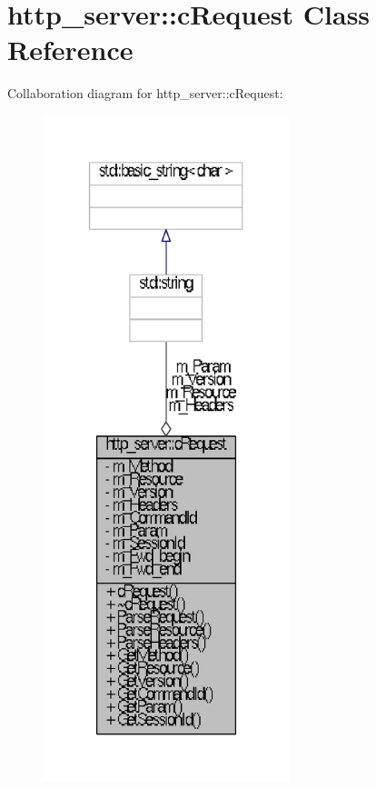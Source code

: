 \hypertarget{classhttp__server_1_1cRequest}{\section{http\-\_\-server\-:\-:c\-Request \-Class \-Reference}
\label{classhttp__server_1_1cRequest}
}


\-Collaboration diagram for http\-\_\-server\-:\-:c\-Request\-:
\nopagebreak
\begin{figure}[H]
\begin{center}
\leavevmode
\includegraphics[height=550pt]{classhttp__server_1_1cRequest__coll__graph}
\end{center}
\end{figure}
